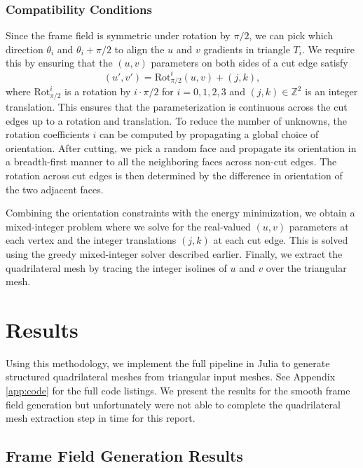 \documentclass[12pt, letterpaper]{article}
\begin{document}
\subsubsection{Compatibility Conditions}
Since the frame field is symmetric under rotation by $\pi/2$, we can pick which direction $\theta_i$ and $\theta_i + \pi/2$ to align the $u$ and $v$ gradients in triangle $T_i$. We require this by ensuring that the $(u,v)$ parameters on both sides of a cut edge satisfy 
\begin{equation*}
    (u', v') = \text{Rot}_{\pi/2}^i(u,v) + (j,k),
\end{equation*}
where $\text{Rot}_{\pi/2}^i$ is a rotation by $i \cdot \pi/2$ for $i = 0, 1, 2, 3$ and $(j,k) \in \mathbb{Z}^2$ is an integer translation. This ensures that the parameterization is continuous across the cut edges up to a rotation and translation. To reduce the number of unknowns, the rotation coefficients $i$ can be computed by propagating a global choice of orientation. After cutting, we pick a random face and propagate its orientation in a breadth-first manner to all the neighboring faces across non-cut edges. The rotation across cut edges is then determined by the difference in orientation of the two adjacent faces. 

Combining the orientation constraints with the energy minimization, we obtain a mixed-integer problem where we solve for the real-valued $(u,v)$ parameters at each vertex and the integer translations $(j,k)$ at each cut edge. This is solved using the greedy mixed-integer solver described earlier. Finally, we extract the quadrilateral mesh by tracing the integer isolines of $u$ and $v$ over the triangular mesh.


\section{Results}
Using this methodology, we implement the full pipeline in Julia to generate structured quadrilateral meshes from triangular input meshes. See Appendix \ref{app:code} for the full code listings. We present the results for the smooth frame field generation but unfortunately were not able to complete the quadrilateral mesh extraction step in time for this report.

\subsection{Frame Field Generation Results}
\end{document}
